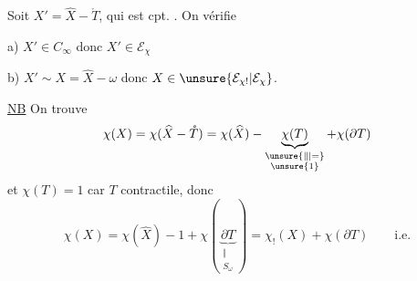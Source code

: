 
Soit $X'=\widehat X-\mathring T$, qui est cpt. . On vérifie


a) $X'\in C_\infty$ donc $X'\in\mathcal E_\chi$

b) $X'\sim X=\widehat X-\omega$ donc $X\in\unsure{\mathcal E_{\chi!}|\mathcal E_\chi}$.

\uline{NB} On trouve
\[
\chi(X)=\chi(\widehat X-\mathring T)=\chi(\widehat X)-\underbrace{\chi(T)}_{\substack{\unsure{\Vert|=}\\\unsure{1}}}+\chi(\partial T)
\]
et $\chi(T)=1$ car $T$ contractile, donc
\[
\chi(X)=\chi(\widehat X)-1+\chi(\underbrace{\partial T}_{\substack{\Vert\\S_\omega}})=\chi_!(X)+\chi(\partial T)\qquad\text{i.e.}
\]

